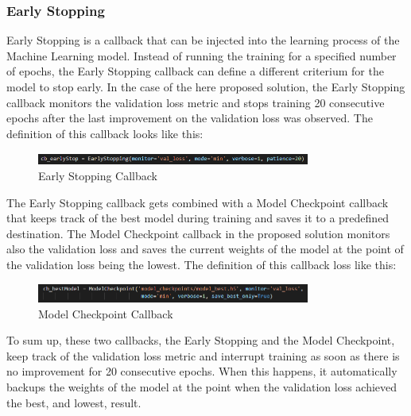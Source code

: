 \subsubsection{Early Stopping}
Early Stopping is a callback that can be injected into the learning process of the Machine Learning model. Instead of running the training for a specified number of epochs, the Early Stopping callback can define a different criterium for the model to stop early. In the case of the here proposed solution, the Early Stopping callback monitors the validation loss metric and stops training 20 consecutive epochs after the last improvement on the validation loss was observed. The definition of this callback looks like this:

\begin{figure}[H]
  \begin{center}
  \includegraphics[angle=0, width=0.8\textwidth]{Figures/EarlyStopping.PNG}
  \caption{Early Stopping Callback}
  \label{fig:EarlyStopping}
  \end{center}
\end{figure}

The Early Stopping callback gets combined with a Model Checkpoint callback that keeps track of the best model during training and saves it to a predefined destination. The Model Checkpoint callback in the proposed solution monitors also the validation loss and saves the current weights of the model at the point of the validation loss being the lowest. The definition of this callback loss like this:

\begin{figure}[H]
  \begin{center}
  \includegraphics[angle=0, width=0.8\textwidth]{Figures/ModelCheckpoint.PNG}
  \caption{Model Checkpoint Callback}
  \label{fig:ModelCheckpoint}
  \end{center}
\end{figure}

To sum up, these two callbacks, the Early Stopping and the Model Checkpoint, keep track of the validation loss metric and interrupt training as soon as there is no improvement for 20 consecutive epochs. When this happens, it automatically backups the weights of the model at the point when the validation loss achieved the best, and lowest, result.

